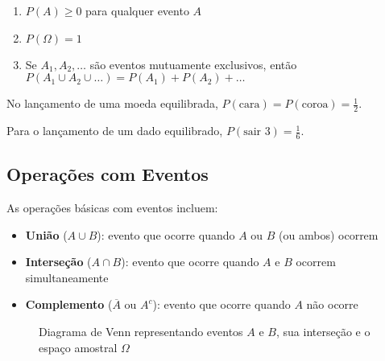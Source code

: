 \documentclass[a4paper,12pt]{article}
\begin{document}
\begin{enumerate}[label=(\roman*)]
    \item $P(A) \geq 0$ para qualquer evento $A$
    \item $P(\Omega) = 1$
    \item Se $A_1, A_2, \ldots$ são eventos mutuamente exclusivos, então $P(A_1 \cup A_2 \cup \ldots) = P(A_1) + P(A_2) + \ldots$
\end{enumerate}

\begin{tcolorbox}[colback=gray!10, colframe=black, title=\textbf{Exemplo}]
No lançamento de uma moeda equilibrada, $P(\text{cara}) = P(\text{coroa}) = \frac{1}{2}$.

Para o lançamento de um dado equilibrado, $P(\text{sair 3}) = \frac{1}{6}$.
\end{tcolorbox}

\subsection{Operações com Eventos}

As operações básicas com eventos incluem:

\begin{itemize}
    \item \textbf{União} ($A \cup B$): evento que ocorre quando $A$ ou $B$ (ou ambos) ocorrem
    \item \textbf{Interseção} ($A \cap B$): evento que ocorre quando $A$ e $B$ ocorrem simultaneamente
    \item \textbf{Complemento} ($\overline{A}$ ou $A^c$): evento que ocorre quando $A$ não ocorre
\end{itemize}

\begin{figure}[H]
\centering
{}
\caption{Diagrama de Venn representando eventos $A$ e $B$, sua interseção e o espaço amostral $\Omega$}
\end{figure}
\end{document}
